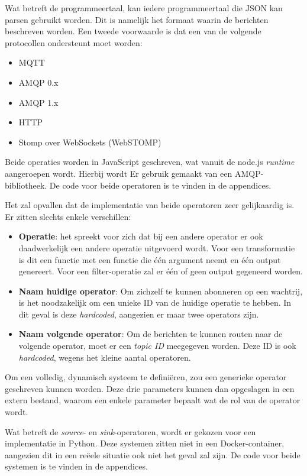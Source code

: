 \documentclass[twocolumn, a4paper]{article}
\begin{document}
Wat betreft de programmeertaal, kan iedere programmeertaal die JSON kan parsen gebruikt worden. Dit is namelijk het formaat waarin de berichten beschreven worden. Een tweede voorwaarde is dat een van de volgende protocollen ondersteunt moet worden:
\begin{itemize}
    \item MQTT
    \item AMQP 0.x
    \item AMQP 1.x
    \item HTTP
    \item Stomp over WebSockets (WebSTOMP)
\end{itemize}

Beide operaties worden in JavaScript geschreven, wat vanuit de node.js \emph{runtime} aangeroepen wordt. Hierbij wordt Er gebruik gemaakt van een AMQP-bibliotheek. De code voor beide operatoren is te vinden in de appendices. 

Het zal opvallen dat de implementatie van beide operatoren zeer gelijkaardig is. Er zitten slechts enkele verschillen:

\begin{itemize}
    \item \textbf{Operatie}: het spreekt voor zich dat bij een andere operator er ook daadwerkelijk een andere operatie uitgevoerd wordt. Voor een transformatie is dit een functie met een functie die één argument neemt en één output genereert. Voor een filter-operatie zal er één of geen output gegeneerd worden.
    \item \textbf{Naam huidige operator}: Om zichzelf te kunnen abonneren op een wachtrij, is het noodzakelijk om een unieke ID van de huidige operatie te hebben. In dit geval is deze \emph{hardcoded}, aangezien er maar twee operators zijn.
    \item \textbf{Naam volgende operator}: Om de berichten te kunnen routen naar de volgende operator, moet er een \emph{topic ID} meegegeven worden. Deze ID is ook \emph{hardcoded}, wegens het kleine aantal operatoren. 
\end{itemize}

Om een volledig, dynamisch systeem te definiëren, zou een generieke operator geschreven kunnen worden. Deze drie parameters kunnen dan opgeslagen in een extern bestand, waarom een enkele parameter bepaalt wat de rol van de operator wordt. 

Wat betreft de \emph{source}- en \emph{sink}-operatoren, wordt er gekozen voor een implementatie in Python. Deze systemen zitten niet in een Docker-container, aangezien dit in een reëele situatie ook niet het geval zal zijn. De code voor beide systemen is te vinden in de appendices.
\end{document}
